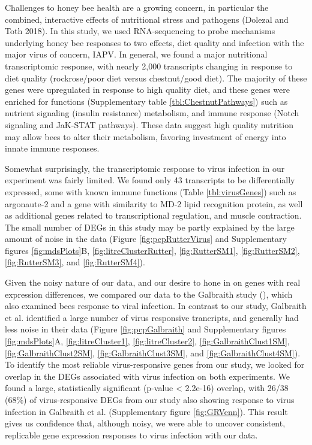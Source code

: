 \documentclass[11pt,a4paper,oldfontcommands,openany]{memoir}
\numberwithin{equation}{section} %
\begin{document}
Challenges to honey bee health are a growing concern, in particular the combined, interactive effects of nutritional stress and pathogens (Dolezal and Toth 2018). In this study, we used RNA-sequencing to probe mechanisms underlying honey bee responses to two effects, diet quality and infection with the major virus of concern, IAPV. In general, we found a major nutritional transcriptomic response, with nearly 2,000 transcripts changing in response to diet quality (rockrose/poor diet versus chestnut/good diet). The majority of these genes were upregulated in response to high quality diet, and these genes were enriched for functions (Supplementary table \ref{tbl:ChestnutPathways}) such as nutrient signaling (insulin resistance) metabolism, and immune response (Notch signaling and JaK-STAT pathways). These data suggest high quality nutrition may allow bees to alter their metabolism, favoring investment of energy into innate immune responses.  

Somewhat surprisingly, the transcriptomic response to virus infection in our experiment was fairly limited. We found only 43 transcripts to be differentially expressed, some with known immune functions (Table \ref{tbl:virusGenes}) such as argonaute-2 and a gene with similarity to MD-2 lipid recognition protein, as well as additional genes related to transcriptional regulation, and muscle contraction. The small number of DEGs in this study may be partly explained by the large amount of noise in the data (Figure \ref{fig:pcpRutterVirus} and Supplementary figures \ref{fig:mdsPlots}B, \ref{fig:litreClusterRutter}, \ref{fig:RutterSM1}, \ref{fig:RutterSM2}, \ref{fig:RutterSM3}, and \ref{fig:RutterSM4}).

Given the noisy nature of our data, and our desire to hone in on genes with real expression differences, we compared our data to the Galbraith study (\citealt{galbraith}), which also examined bees response to viral infection. In contrast to our study, Galbraith et al. identified a large number of virus responsive trancripts, and generally had less noise in their data (Figure \ref{fig:pcpGalbraith} and Supplementary figures \ref{fig:mdsPlots}A, \ref{fig:litreCluster1}, \ref{fig:litreCluster2}, \ref{fig:GalbraithClust1SM}, \ref{fig:GalbraithClust2SM}, \ref{fig:GalbraithClust3SM}, and \ref{fig:GalbraithClust4SM}). To identify the most reliable virus-responsive genes from our study, we looked for overlap in the DEGs associated with virus infection on both experiments. We found a large, statistically significant (p-value < 2.2e-16) overlap, with 26/38 (68\%) of virus-responsive DEGs from our study also showing response to virus infection in Galbraith et al. (Supplementary figure \ref{fig:GRVenn}). This result gives us confidence that, although noisy, we were able to uncover consistent, replicable gene expression responses to virus infection with our data.  
\end{document}
